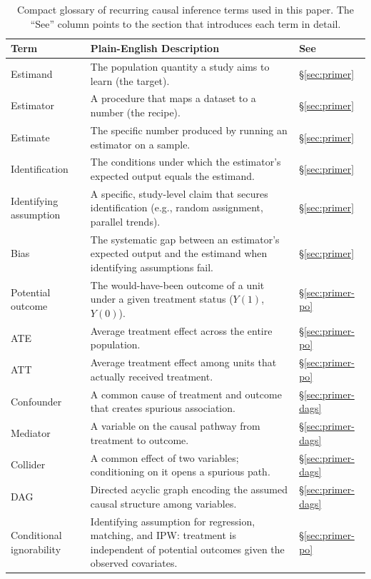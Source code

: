 \begin{table}[t]
\centering
\caption{Compact glossary of recurring causal inference terms used in this paper.
The ``See'' column points to the section that introduces each term in detail.}
\label{tab:glossary}
\footnotesize
\begin{tabularx}{\linewidth}{@{} p{3.0cm} X p{1.5cm} @{}}
\toprule
\textbf{Term} & \textbf{Plain-English Description} & \textbf{See} \\
\midrule
Estimand & The population quantity a study aims to learn (the target). & \S\ref{sec:primer} \\
Estimator & A procedure that maps a dataset to a number (the recipe). & \S\ref{sec:primer} \\
Estimate & The specific number produced by running an estimator on a sample. & \S\ref{sec:primer} \\
Identification & The conditions under which the estimator's expected output equals the estimand. & \S\ref{sec:primer} \\
Identifying assumption & A specific, study-level claim that secures identification (e.g., random assignment, parallel trends). & \S\ref{sec:primer} \\
Bias & The systematic gap between an estimator's expected output and the estimand when identifying assumptions fail. & \S\ref{sec:primer} \\
\addlinespace
Potential outcome & The would-have-been outcome of a unit under a given treatment status ($Y(1)$, $Y(0)$). & \S\ref{sec:primer-po} \\
ATE & Average treatment effect across the entire population. & \S\ref{sec:primer-po} \\
ATT & Average treatment effect among units that actually received treatment. & \S\ref{sec:primer-po} \\
\addlinespace
Confounder & A common cause of treatment and outcome that creates spurious association. & \S\ref{sec:primer-dags} \\
Mediator & A variable on the causal pathway from treatment to outcome. & \S\ref{sec:primer-dags} \\
Collider & A common effect of two variables; conditioning on it opens a spurious path. & \S\ref{sec:primer-dags} \\
DAG & Directed acyclic graph encoding the assumed causal structure among variables. & \S\ref{sec:primer-dags} \\
\addlinespace
Conditional ignorability & Identifying assumption for regression, matching, and IPW: treatment is independent of potential outcomes given the observed covariates. & \S\ref{sec:primer-po} \\

\end{tabularx}
\end{table}
